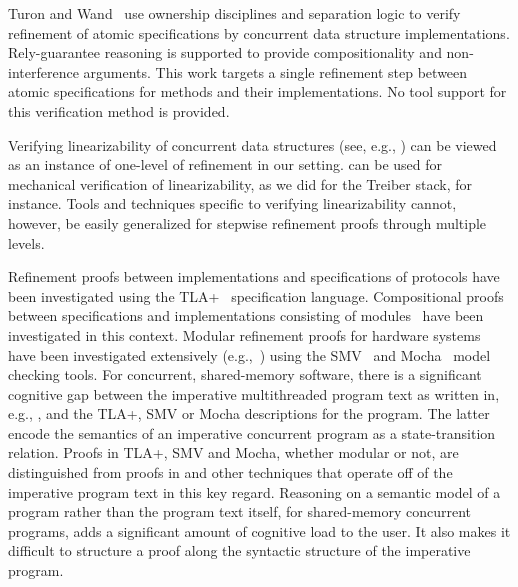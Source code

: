 Turon and Wand~\cite{TuronM11} use ownership disciplines and
separation logic to verify refinement of atomic specifications by 
concurrent data structure implementations. Rely-guarantee reasoning is
supported to provide compositionality and non-interference
arguments. This work targets a single refinement step between atomic
specifications for methods and their implementations. 
No tool support for this verification method is provided. 

Verifying linearizability of concurrent data structures (see, e.g.,
\cite{tacasLin,aliLin}) can be viewed as an instance of one-level of
refinement in our setting. \civl can be used for mechanical
verification of linearizability, as we did for the Treiber stack, for
instance. Tools and techniques specific to verifying linearizability
cannot, however, be easily generalized for stepwise refinement proofs
through multiple levels. 

Refinement proofs
between implementations and specifications of protocols have been
investigated using the TLA+~\cite{Lamport2004} specification
language. 
Compositional proofs between specifications and
implementations consisting of modules~\cite{AbadiAssumeGuarantee} have
been investigated in this context. 
Modular refinement proofs for hardware systems have been investigated extensively
(e.g.,~\cite{Henzinger1999,Eiriksson2000}) using the SMV~\cite{McMillan00} and Mocha~\cite{AlurHMQRT98} 
model checking tools.
For concurrent, shared-memory
software, there is a significant cognitive gap between the imperative
multithreaded program text as written in, e.g., \civl, and the TLA+,
SMV or Mocha descriptions for the program. The latter encode the
semantics of an imperative concurrent program as a
state-transition relation. 
Proofs in TLA+, SMV and Mocha, whether modular or not, are
distinguished from proofs in \civl and other techniques that operate
off of the imperative program text in this key regard. 
Reasoning on a
semantic model of a program rather than the program text itself, for
shared-memory concurrent programs, adds a significant amount of
cognitive load to the user. 
It also makes it difficult to structure a
proof along the syntactic structure of the imperative program. 


